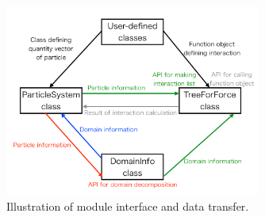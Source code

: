 \begin{figure}[h]
\centering
\includegraphics[width=0.75\textwidth]{./fig/illustration.pdf}
\caption{Illustration of module interface and data transfer.}
\label{fig:brief_interface}
\end{figure}
